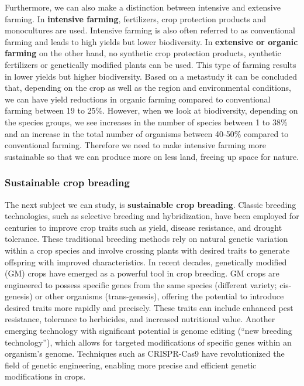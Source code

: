 \documentclass[../summary.tex]{subfiles}
\begin{document}
	Furthermore, we can also make a distinction between intensive and extensive farming. In \textbf{intensive farming}, fertilizers, crop protection products and monocultures are used. Intensive farming is also often referred to as conventional farming and leads to high yields but lower biodiversity. In \textbf{extensive or organic farming} on the other hand, no synthetic crop protection products, synthetic fertilizers or genetically modified plants can be used. This type of farming results in lower yields but higher biodiversity. Based on a metastudy it can be concluded that, depending on the crop as well as the region and environmental conditions, we can have yield reductions in organic farming compared to conventional farming between 19 to 25\%. However, when we look at biodiversity, depending on the species groups, we see increases in the number of species between 1 to 38\% and an increase in the total number of organisms between 40-50\% compared to conventional farming. Therefore we need to make intensive farming more sustainable so that we can produce more on less land, freeing up space for nature.
	
	\subsubsection{Sustainable crop breading}
	
	The next subject we can study, is \textbf{sustainable crop breading}. Classic breeding technologies, such as selective breeding and hybridization, have been employed for centuries to improve crop traits such as yield, disease resistance, and drought tolerance. These traditional breeding methods rely on natural genetic variation within a crop species and involve crossing plants with desired traits to generate offspring with improved characteristics. In recent decades, genetically modified (GM) crops have emerged as a powerful tool in crop breeding. GM crops are engineered to possess specific genes from the same species (different variety; cis-genesis) or other organisms (trans-genesis), offering the potential to introduce desired traits more rapidly and precisely. These traits can include enhanced pest resistance, tolerance to herbicides, and increased nutritional value. Another emerging technology with significant potential is genome editing (“new breeding technology”), which allows for targeted modifications of specific genes within an organism's genome. Techniques such as CRISPR-Cas9 have revolutionized the field of genetic engineering, enabling more precise and efficient genetic modifications in crops. 
	
\end{document}
